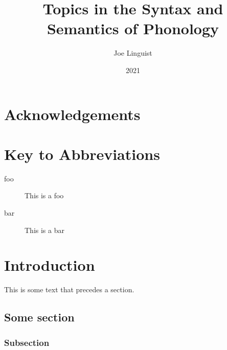 \documentclass[lscape]{msu-thesis}
\title{Topics in the Syntax and Semantics of Phonology}
\author{Joe Linguist}
\date{2021}
\begin{document}
\frontmatter
\maketitlepage
\begin{publicabstract}
\lipsum[1]
\end{publicabstract}
\begin{abstract}
\lipsum[1-6]
\end{abstract}
\clearpage
\makecopyrightpage
\makededicationpage
\clearpage
\chapter*{Acknowledgements}
\DoubleSpacing
\lipsum[1]
\clearpage
\SingleSpacing
\tableofcontents* %
\clearpage
\listoftables
\clearpage
\listoffigures
\clearpage
\listoflistings
\clearpage
\chapter{Key to Abbreviations}
\vspace{\cftparskip} %
\begin{description}
\item[foo]  This is a foo
\item[bar] This is a bar
\end{description}
\mainmatter
\chapter{Introduction}
This is some text that precedes a section.
\section{Some section}
\lipsum[2]

\subsection{Subsection}
\lipsum
\end{document}
